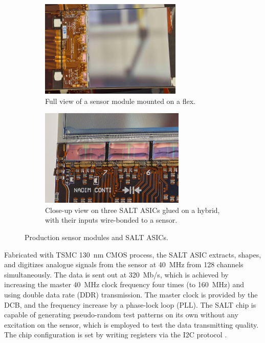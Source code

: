 \begin{figure}[!htb]
    \centering
    \begin{subfigure}[t]{0.48\textwidth}
        \centering
        \includegraphics[height=12.5em]{./figs-ut-upgrade/stave/stave_sensors.jpg}
        \caption{
            Full view of a sensor module mounted on a flex.
        }
    \end{subfigure}
    \hfill{}
    \begin{subfigure}[t]{0.48\textwidth}
        \centering
        \includegraphics[height=12.5em]{./figs-ut-upgrade/stave/stave_hybrid_closeup.jpg}
        \caption{
            Close-up view on three SALT ASICs glued on a hybrid,
            with their inputs wire-bonded to a sensor.
        }
    \end{subfigure}
    \caption{
        Production sensor modules and SALT ASICs.
    }
    \label{fig:ut-module}
\end{figure}

Fabricated with TSMC 130~nm CMOS process, the SALT ASIC extracts, shapes,
and digitizes analogue signals from the sensor at 40~MHz from 128 channels
simultaneously.
The data is sent out at 320~Mb/s,
which is achieved by increasing the master 40~MHz clock frequency four times
(to 160~MHz) and using double data rate (DDR) transmission.
The master clock is provided by the DCB,
and the frequency increase by a phase-lock loop (PLL).
The SALT chip is capable of generating pseudo-random test patterns on its own
without any excitation on the sensor,
which is employed to test the data transmitting quality.
The chip configuration is set by writing registers via the I2C protocol
\cite{s22010107}.


